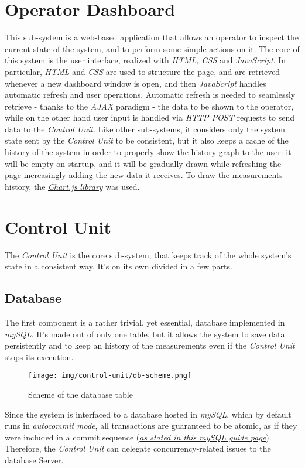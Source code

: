 \documentclass[a4paper,12pt]{report}
\begin{document}
	\section{Operator Dashboard}
	This sub-system is a web-based application that allows an operator to inspect the current state of the system, and to perform some simple actions on it. The core of this system is the user interface, realized with \textit{HTML, CSS} and \textit{JavaScript}.
	\newline In particular, \textit{HTML} and \textit{CSS} are used to structure the page, and are retrieved whenever a new dashboard window is open, and then \textit{JavaScript} handles automatic refresh and user operations. Automatic refresh is needed to seamlessly retrieve - thanks to the \textit{AJAX} paradigm - the data to be shown to the operator, while on the other hand user input is handled via \textit{HTTP POST} requests to send data to the \textit{Control Unit}.
	\newline Like other sub-systems, it considers only the system state sent by the \textit{Control Unit} to be consistent, but it also keeps a cache of the history of the system in order to properly show the history graph to the user: it will be empty on startup, and it will be gradually drawn while refreshing the page increasingly adding the new data it receives.
	\newline To draw the measurements history, the \href{https://www.w3schools.com/ai/ai_chartjs.asp}{\textit{Chart.js library}} was used.
	\section{Control Unit}
	The \textit{Control Unit} is the core sub-system, that keeps track of the whole system's state in a consistent way. It's on its own divided in a few parts.
		\subsection{Database}
		The first component is a rather trivial, yet essential, database implemented in \textit{mySQL}. It's made out of only one table, but it allows the system to save data persistently and to keep an history of the measurements even if the \textit{Control Unit} stops its execution.
		\begin{figure}[H]
			\centering{}
			\texttt{[image: img/control-unit/db-scheme.png]}
			\caption{Scheme of the database table}
			\label{img:control-unit/db-scheme}
		\end{figure}
		Since the system is interfaced to a database hosted in \textit{mySQL}, which by default runs in \textit{autocommit mode}, all transactions are guaranteed to be atomic, as if they were included in a commit sequence (\href{https://dev.mysql.com/doc/refman/8.4/en/commit.html}{\textit{as stated in this mySQL guide page}}). Therefore, the \textit{Control Unit} can delegate concurrency-related issues to the database Server.
\end{document}
